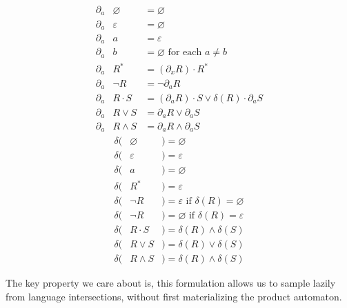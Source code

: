 \documentclass[portrait,a0b,final,a4resizeable]{a0poster}
\begin{document}
\begin{poster}
\begin{multicols}{2}
\vspace{-1cm}
\begin{multicols}{2}
\begin{eqnarray*}
\partial_a & \varnothing & = \varnothing                                           \\
\partial_a & \varepsilon & = \varnothing                                           \\
\partial_a & a           & = \varepsilon                                           \\
\partial_a & b           & = \varnothing  \text{ for each } a \neq b               \\
\partial_a & R^*         & = (\partial_x R)\cdot R^*                               \\
\partial_a & \neg R      & = \neg \partial_a R                                     \\
\partial_a & R\cdot S    & = (\partial_a R)\cdot S \vee \delta(R)\cdot\partial_a S \\
\partial_a & R\vee S     & = \partial_a R \vee \partial_a S                        \\
\partial_a & R\land S    & = \partial_a R \land \partial_a S
\end{eqnarray*} \break\vspace{-0.45cm}
\begin{eqnarray*}
\delta(& \varnothing &)= \varnothing                                      \\
\delta(& \varepsilon &)= \varepsilon                                      \\
\delta(& a           &)= \varnothing                                      \\
\delta(& R^*         &)= \varepsilon                                      \\
\delta(& \neg R      &)= \varepsilon \text{ if } \delta(R) = \varnothing  \\
\delta(& \neg R      &)= \varnothing \text{ if } \delta(R) = \varepsilon  \\
\delta(& R\cdot S    &)= \delta(R) \land \delta(S)                        \\
\delta(& R\vee S     &)= \delta(R) \vee  \delta(S)                        \\
\delta(& R\land S    &)= \delta(R) \land \delta(S)
\end{eqnarray*}
\end{multicols}

    \hspace*{2cm}\begin{minipage}[c]{0.90\columnwidth}
    The key property we care about is, this formulation allows us to sample lazily from language intersections, without first materializing the product automaton.
    \end{minipage}


\end{multicols}
\end{poster}
\end{document}
